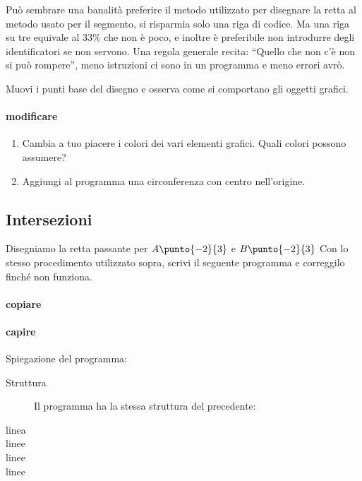 \begin{osservazione}

Può sembrare una banalità preferire il metodo utilizzato per disegnare la 
retta al metodo usato per il segmento, si risparmia solo una riga di codice. 
Ma una riga su tre equivale al 33\% che non è poco, e inoltre è 
preferibile non introdurre degli identificatori se non servono. Una regola 
generale recita: ``Quello che non c'è non si può rompere'', meno istruzioni ci 
sono in un programma e meno errori avrò.

Muovi i punti base del disegno e osserva come si comportano gli oggetti grafici.
\end{osservazione}

\paragraph{modificare}
\begin{enumerate} [noitemsep]
 \item Cambia a tuo piacere i colori dei vari elementi grafici. Quali colori 
possono assumere?
 \item Aggiungi al programma una circonferenza con centro nell'origine.
\end{enumerate}

\subsection{Intersezioni}
\label{subsec:geo_int_intersezioni}
Disegniamo la retta passante per \(A\punto{-2}{3}\) e \(B\punto{-2}{3}\) 
Con lo stesso procedimento utilizzato sopra, scrivi il seguente programma e 
correggilo finché non funziona.

\paragraph{copiare}



\paragraph{capire}
Spiegazione del programma:

\begin{description}
 \item [Struttura] 
 Il programma ha la stessa struttura del precedente:
 \item [linea ]
 
 \item [linee ]
 
 \item [linee ]
 \item [linee ]
\end{description}

